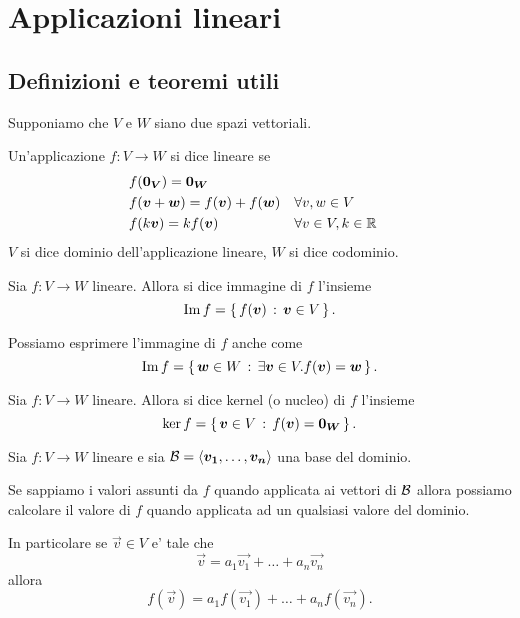 \chapter{Applicazioni lineari}

\section{Definizioni e teoremi utili}

Supponiamo che $V$ e $W$ siano due spazi vettoriali.

\begin{definition}
    Un'applicazione $f : V \to W$ si dice lineare
    se
    \begin{align}
        &f(\bm{0_V}) = \bm{0_W} \\
        &f(\bm{v} + \bm{w}) = f(\bm{v}) + f(\bm{w}) &&\forall v, w \in V \\
        &f(k\bm{v}) = kf(\bm{v})                    &&\forall v\in V, k \in \mathbb{R} 
    \end{align}
    $V$ si dice dominio dell'applicazione lineare, $W$ si dice codominio.
\end{definition}

\begin{definition}
    Sia $f : V \to W$ lineare. Allora si dice immagine di $f$ l'insieme \begin{equation}
        \operatorname{Im}f = \left\{\, f(\bm{v}) \,:\, \bm{v} \in V\,\right\}.
    \end{equation}
\end{definition}

\begin{remark}
    Possiamo esprimere l'immagine di $f$ anche come \[
        \operatorname{Im}f = \left\{\, \bm{w} \in W \,:\, \exists \bm{v} \in V. f(\bm{v}) = \bm{w}\,\right\}.
    \]
\end{remark}

\begin{definition}
    Sia $f : V \to W$ lineare. Allora si dice kernel (o nucleo) di $f$ l'insieme \begin{equation}
        \ker{f} = \left\{\, \bm{v} \in V \,:\, f(\bm{v}) = \bm{0_W}\,\right\}.
    \end{equation}
\end{definition}

\begin{proposition}\label{def_attraverso_base}
    Sia $f : V \to W$ lineare e sia $\mathcal{B} = \left\langle \bm{v_1}, \dots, \bm{v_n} \right\rangle$ una base del dominio. 

    Se sappiamo i valori assunti da $f$ quando applicata ai vettori di $\mathcal{B}$ allora possiamo calcolare il valore di $f$ quando applicata ad un qualsiasi valore del dominio.

    In particolare se $\vec v \in V$ e' tale che \[
        \vec v = a_1\vec{v_1} + \dots + a_n\vec{v_n}    
    \] allora \[
        f(\vec v) = a_1f(\vec{v_1}) + \dots + a_nf(\vec{v_n}). 
    \]
\end{proposition}

